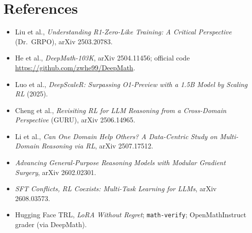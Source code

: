 \documentclass[10pt,a4paper]{article}
\begin{document}
\section{References}
\begin{itemize}
\item Liu et al., \emph{Understanding R1-Zero-Like Training: A Critical Perspective} (Dr.~GRPO), arXiv 2503.20783.
\item He et al., \emph{DeepMath-103K}, arXiv 2504.11456; official code \url{https://github.com/zwhe99/DeepMath}.
\item Luo et al., \emph{DeepScaleR: Surpassing O1-Preview with a 1.5B Model by Scaling RL} (2025).
\item Cheng et al., \emph{Revisiting RL for LLM Reasoning from a Cross-Domain Perspective} (GURU), arXiv 2506.14965.
\item Li et al., \emph{Can One Domain Help Others? A Data-Centric Study on Multi-Domain Reasoning via RL}, arXiv
      2507.17512.
\item \emph{Advancing General-Purpose Reasoning Models with Modular Gradient Surgery}, arXiv 2602.02301.
\item \emph{SFT Conflicts, RL Coexists: Multi-Task Learning for LLMs}, arXiv 2608.03573.
\item Hugging Face TRL, \emph{LoRA Without Regret}; \texttt{math-verify}; OpenMathInstruct grader (via DeepMath).
\end{itemize}
\end{document}

